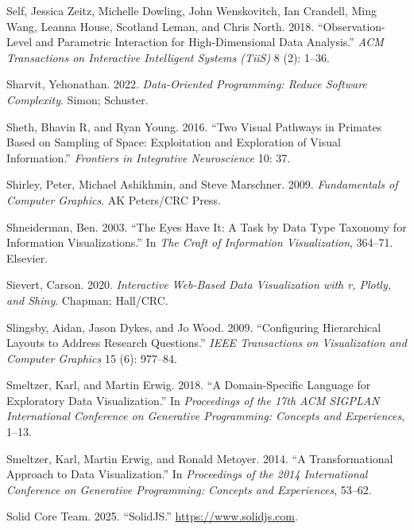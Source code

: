 \documentclass[
  openany]{book}
\newlength{\cslhangindent}
\newenvironment{CSLReferences}[2] %
 {\begin{list}{}{%
  \setlength{\itemindent}{0pt}
  \setlength{\leftmargin}{0pt}
  \setlength{\parsep}{0pt}
  \ifodd #1
   \setlength{\leftmargin}{\cslhangindent}
   \setlength{\itemindent}{-1\cslhangindent}
  \fi
  \setlength{\itemsep}{#2\baselineskip}}}
 {\end{list}}
\theoremstyle{definition}
\theoremstyle{definition}
\theoremstyle{definition}
\theoremstyle{definition}
\theoremstyle{remark}
\begin{document}
\begin{CSLReferences}{1}{0}
Self, Jessica Zeitz, Michelle Dowling, John Wenskovitch, Ian Crandell, Ming Wang, Leanna House, Scotland Leman, and Chris North. 2018. {``Observation-Level and Parametric Interaction for High-Dimensional Data Analysis.''} \emph{ACM Transactions on Interactive Intelligent Systems (TiiS)} 8 (2): 1--36.

Sharvit, Yehonathan. 2022. \emph{Data-Oriented Programming: Reduce Software Complexity}. Simon; Schuster.

Sheth, Bhavin R, and Ryan Young. 2016. {``Two Visual Pathways in Primates Based on Sampling of Space: Exploitation and Exploration of Visual Information.''} \emph{Frontiers in Integrative Neuroscience} 10: 37.

Shirley, Peter, Michael Ashikhmin, and Steve Marschner. 2009. \emph{Fundamentals of Computer Graphics}. AK Peters/CRC Press.

Shneiderman, Ben. 2003. {``The Eyes Have It: A Task by Data Type Taxonomy for Information Visualizations.''} In \emph{The Craft of Information Visualization}, 364--71. Elsevier.

Sievert, Carson. 2020. \emph{Interactive Web-Based Data Visualization with r, Plotly, and Shiny}. Chapman; Hall/CRC.

Slingsby, Aidan, Jason Dykes, and Jo Wood. 2009. {``Configuring Hierarchical Layouts to Address Research Questions.''} \emph{IEEE Transactions on Visualization and Computer Graphics} 15 (6): 977--84.

Smeltzer, Karl, and Martin Erwig. 2018. {``A Domain-Specific Language for Exploratory Data Visualization.''} In \emph{Proceedings of the 17th ACM SIGPLAN International Conference on Generative Programming: Concepts and Experiences}, 1--13.

Smeltzer, Karl, Martin Erwig, and Ronald Metoyer. 2014. {``A Transformational Approach to Data Visualization.''} In \emph{Proceedings of the 2014 International Conference on Generative Programming: Concepts and Experiences}, 53--62.

Solid Core Team. 2025. {``SolidJS.''} \url{https://www.solidjs.com}.


\end{CSLReferences}
\end{document}
